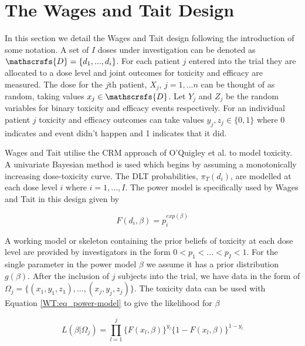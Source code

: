 \section{The Wages and Tait Design}
\label{WT:Wages-and-Tait-Design}

In this section we detail the Wages and Tait design following the introduction of some notation. A set of $I$ doses under investigation can be denoted as $\mathscrsfs{D} = \{d_1, ...,d_i\}$. For each patient $j$ entered into the trial they are allocated to a dose level and joint outcomes for toxicity and efficacy are measured. The dose for the $j$th patient, $X_j$, $j = 1,...n$ can be thought of as random, taking values $x_j \in  \mathscrsfs{D}$. Let $Y_j$ and $Z_j$ be the random variables for binary toxicity and efficacy events respectively. For an individual patient $j$ toxicity and efficacy outcomes can take values $y_j, z_j \in \{0,1\}$ where 0 indicates and event didn't happen and 1 indicates that it did. 

Wages and Tait \cite{wagesSeamlessPhaseII2015} utilise the CRM approach of O'Quigley et al. \cite{oquigleyContinualReassessmentMethod1990} to model toxicity. A univariate Bayesian method is used which begins by assuming a monotonically increasing dose-toxicity curve. The DLT probabilities, $\pi_T(d_i)$, are modelled at each dose level $i$ where $i= 1, ..., I$. The power model is specifically used by Wages and Tait in this design given by 

\begin{equation}
\label{WT:eq_power-model}
F(d_i, \beta) = p_i^{exp(\beta)}
\end{equation}

A working model or skeleton containing the prior beliefs of toxicity at each dose level are provided by investigators in the form $0 < p_1 < ... <p_I <1$. For the single parameter in the power model $\beta$ we assume it has a prior distribution $g(\beta)$. After the inclusion of $j$ subjects into the trial, we have  data in the form of $\Omega_j = \{(x_1,y_1,z_1), ..., (x_j,y_j,z_j)\}$. The toxicity data can be used with Equation \ref{WT:eq_power-model} to give the likelihood for $\beta$

\begin{equation}
L(\beta|\Omega_j)=\prod_{l=1}^{j}\{F(x_l,\beta)\}^{y_l}\{1-F(x_l,\beta)\}^{1-y_l}  
\end{equation}

